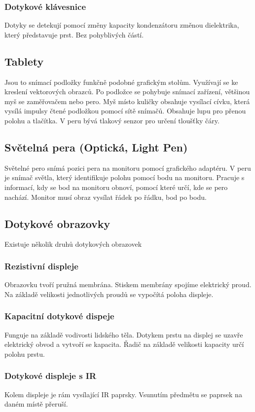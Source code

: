     \subsubsection{Dotykové klávesnice}
      Dotyky se detekují pomocí změny kapacity kondenzátoru změnou dielektrika, který představuje prst.
      Bez pohyblivých částí.
  \subsection{Tablety}
    Jsou to snímací podložky funkčně podobné grafickým stolům.
    Využívají se ke kreslení vektorových obrazců.
    Po podložce se pohybuje snímací zařízení, většinou myš se zaměřovačem nebo pero.
    Myš místo kuličky obsahuje vysílací cívku, která vysílá impulsy čtené podložkou pomocí sítě snímačů.
    Obsahuje lupu pro přenou polohu a tlačítka.
    V peru bývá tlakový senzor pro určení tloušťky čáry.
  \subsection{Světelná pera (Optická, Light Pen)}
    Světelné pero snímá pozici pera na monitoru pomocí grafického adaptéru.
    V peru je snímač světla, který identifikuje polohu pomocí bodu na monitoru.
    Pracuje s informací, kdy se bod na monitoru obnoví, pomocí které určí, kde se pero nachází.
    Monitor musí obraz vysílat řádek po řádku, bod po bodu.
  \subsection{Dotykové obrazovky}
    Existuje několik druhů dotykových obrazovek
    \subsubsection{Rezistivní displeje}
    Obrazovku tvoří pružná membrána.
    Stiskem membrány spojíme elektrický proud.
    Na základě velikosti jednotlivých proudů se vypočítá poloha displeje.
    \subsubsection{Kapacitní dotykové dispeje}
    Funguje na základě vodivosti lidského těla.
    Dotykem prstu na displej se uzavře elektrický obvod a vytvoří se kapacita.
    Řadič na základě velikosti kapacity určí polohu prstu.
    \subsubsection{Dotykové displeje s IR}
    Kolem displeje je rám vysílající IR paprsky.
    Vsunutím předmětu se paprsek na daném místě přeruší.
